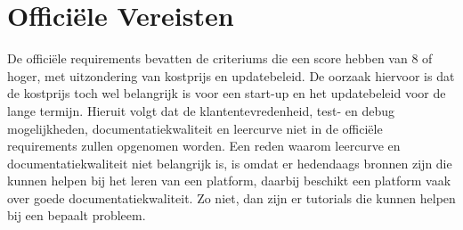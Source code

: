 \section{Officiële Vereisten}%
\label{sec:officiële-vereisten}
De officiële requirements bevatten de criteriums die een score hebben van 8 of hoger, 
met uitzondering van kostprijs en updatebeleid. De oorzaak hiervoor is dat de 
kostprijs toch wel belangrijk is voor een start-up en het updatebeleid voor 
de lange termijn. Hieruit volgt dat de klantentevredenheid, test- en debug mogelijkheden, 
documentatiekwaliteit en leercurve niet in de officiële requirements zullen opgenomen worden. 
Een reden waarom leercurve en documentatiekwaliteit niet belangrijk is, is omdat er hedendaags bronnen 
zijn die kunnen helpen bij het leren van een platform, daarbij beschikt een platform vaak over goede documentatiekwaliteit. Zo niet, 
dan zijn er tutorials die kunnen helpen bij een bepaalt probleem.
